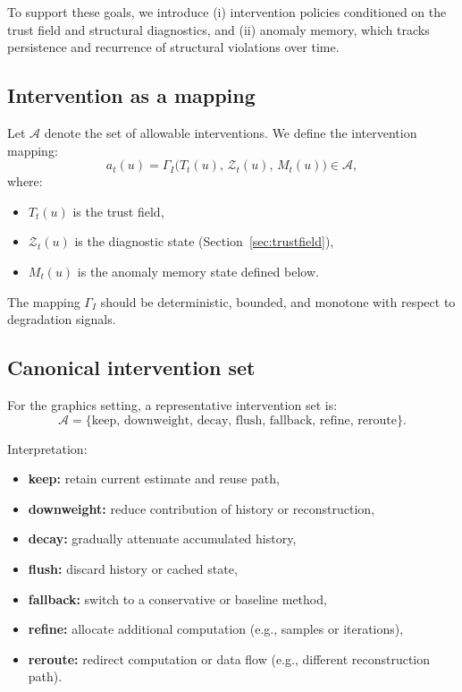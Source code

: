 \documentclass[11pt]{article}
\theoremstyle{definition}
\theoremstyle{plain}
\begin{document}
To support these goals, we introduce (i) intervention policies conditioned on the trust field and structural diagnostics, and (ii) anomaly memory, which tracks persistence and recurrence of structural violations over time.


\subsection{Intervention as a mapping}

Let $\mathcal{A}$ denote the set of allowable interventions. We define the intervention mapping:
\begin{equation}
a_t(u)=\Gamma_I\!\bigl(T_t(u),\,\mathcal{Z}_t(u),\,M_t(u)\bigr)\in\mathcal{A},
\end{equation}
where:
\begin{itemize}[leftmargin=1.5em]
    \item $T_t(u)$ is the trust field,
    \item $\mathcal{Z}_t(u)$ is the diagnostic state (Section~\ref{sec:trustfield}),
    \item $M_t(u)$ is the anomaly memory state defined below.
\end{itemize}

The mapping $\Gamma_I$ should be deterministic, bounded, and monotone with respect to degradation signals.


\subsection{Canonical intervention set}

For the graphics setting, a representative intervention set is:
\begin{equation}
\mathcal{A}=
\{
\mathrm{keep},\,
\mathrm{downweight},\,
\mathrm{decay},\,
\mathrm{flush},\,
\mathrm{fallback},\,
\mathrm{refine},\,
\mathrm{reroute}
\}.
\end{equation}

Interpretation:
\begin{itemize}[leftmargin=1.5em]
    \item \textbf{keep:} retain current estimate and reuse path,
    \item \textbf{downweight:} reduce contribution of history or reconstruction,
    \item \textbf{decay:} gradually attenuate accumulated history,
    \item \textbf{flush:} discard history or cached state,
    \item \textbf{fallback:} switch to a conservative or baseline method,
    \item \textbf{refine:} allocate additional computation (e.g., samples or iterations),
    \item \textbf{reroute:} redirect computation or data flow (e.g., different reconstruction path).
\end{itemize}
\end{document}
